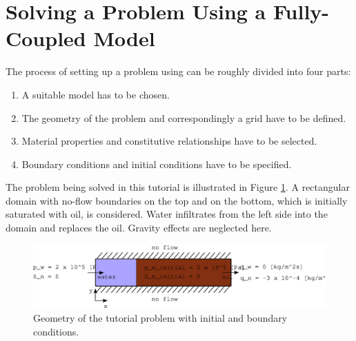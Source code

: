 \section[Fully-Implicit Model]{Solving a Problem Using a Fully-Coupled Model}\label{tutorial-coupled}

The process of setting up a problem using \Dumux can be roughly divided into four parts:
\begin{enumerate}
 \item A suitable model has to be chosen.
 \item The geometry of the problem and correspondingly a grid have to be defined.
 \item Material properties and constitutive relationships have to be selected.
 \item Boundary conditions and initial conditions have to be specified.
\end{enumerate}

The problem being solved in this tutorial is illustrated in Figure \ref{tutorial-coupled:problemfigure}. 
A rectangular domain with no-flow boundaries on the top and on the bottom, which is initially saturated with oil, is considered. 
Water infiltrates from the left side into the domain and replaces the oil. Gravity effects are neglected here.

\begin{figure}[ht]
\centering
\includegraphics[width=0.9\linewidth,keepaspectratio]{EPS/tutorial-problemconfiguration}
\caption{Geometry of the tutorial problem with initial and boundary conditions.}\label{tutorial-coupled:problemfigure}
\end{figure}

